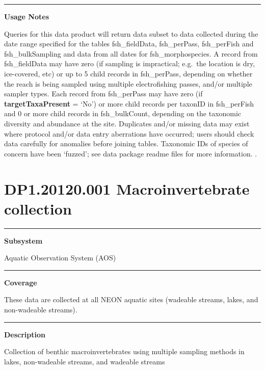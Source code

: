 \documentclass[]{article}
\begin{document}
\begin{center}\rule{0.5\linewidth}{\linethickness}\end{center}

\textbf{Usage Notes}

Queries for this data product will return data subset to data collected
during the date range specified for the tables fsh\_fieldData,
fsh\_perPass, fsh\_perFish and fsh\_bulkSampling and data from all dates
for fsh\_morphospecies. A record from fsh\_fieldData may have zero (if
sampling is impractical; e.g.~the location is dry, ice-covered, etc) or
up to 5 child records in fsh\_perPass, depending on whether the reach is
being sampled using multiple electrofishing passes, and/or multiple
sampler types. Each record from fsh\_perPass may have zero (if
\textbf{targetTaxaPresent} = `No') or more child records per taxonID in
fsh\_perFish and 0 or more child records in fsh\_bulkCount, depending on
the taxonomic diversity and abundance at the site. Duplicates and/or
missing data may exist where protocol and/or data entry aberrations have
occurred; users should check data carefully for anomalies before joining
tables. Taxonomic IDs of species of concern have been `fuzzed'; see data
package readme files for more information. \newpage
.

\section{DP1.20120.001 Macroinvertebrate
collection}\label{dp1.20120.001-macroinvertebrate-collection}

\begin{center}\rule{0.5\linewidth}{\linethickness}\end{center}

\textbf{Subsystem}

Aquatic Observation System (AOS)

\begin{center}\rule{0.5\linewidth}{\linethickness}\end{center}

\textbf{Coverage}

These data are collected at all NEON aquatic sites (wadeable streams,
lakes, and non-wadeable streams).

\begin{center}\rule{0.5\linewidth}{\linethickness}\end{center}

\textbf{Description}

Collection of benthic macroinvertebrates using multiple sampling methods
in lakes, non-wadeable streams, and wadeable streams
\end{document}
